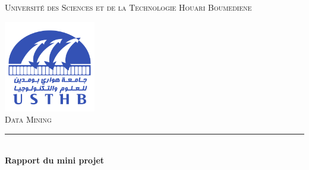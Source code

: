 
\begin{titlepage} %
	\newcommand{\HRule}{\rule{\linewidth}{0.5mm}} %
	
	\center %
	
	
	\baselineskip 
	\textsc{\LARGE Université des Sciences et de la Technologie Houari Boumediene}%

	
	\vfill
	\includegraphics[width=0.3\textwidth]{USTHB_Logo.png}\\[1cm] %
	 
	
	\textsc{\Large Data Mining }\\[0.5cm] %
	
	
	\HRule\\[0.4cm]
	\baselineskip 
	{\huge\bfseries Rapport du mini projet\text  \reportnumber \\ \reporttitle}\\[0.4cm] %
	

\end{titlepage}
